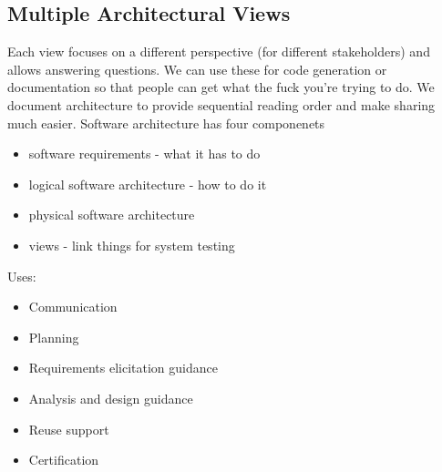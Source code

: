 \documentclass{article}
\begin{document}
\subsection*{Multiple Architectural Views} %
\label{sub:multiple_architectural_views}
Each view focuses on a different perspective (for different stakeholders) and allows answering questions. We can use these for code generation or documentation so that people can get what the fuck you're trying to do. We document architecture to provide sequential reading order and make sharing much easier. Software architecture has four componenets
\begin{itemize}
    \item software requirements - what it has to do
    \item logical software architecture - how to do it
    \item physical software architecture
    \item views - link things for system testing
\end{itemize}
Uses:
\begin{itemize}
    \item  Communication
    \item Planning
    \item Requirements elicitation guidance
    \item Analysis and design guidance
    \item Reuse support
    \item Certification
\end{itemize}


\end{document}

